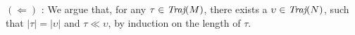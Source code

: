 

$(\Leftarrow)$ : We argue that, for any $\tau \in \operatorname{\textit{Traj}}(M)$, there exists a $\upsilon \in \operatorname{\textit{Traj}}(N)$, such that $| \tau | = | \upsilon |$ and $\tau \ll \upsilon$, by induction on the length of $\tau$. \todo{\dots}
